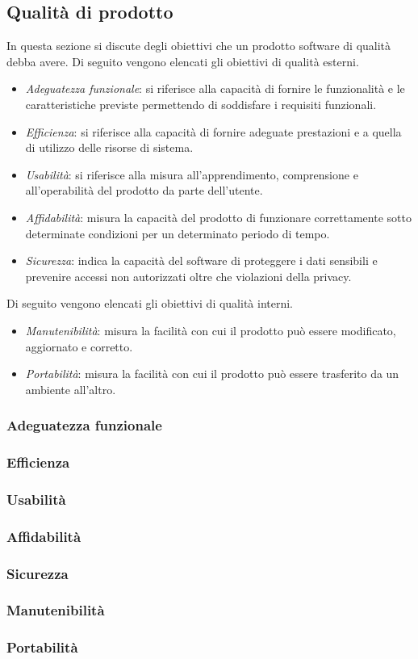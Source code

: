 \subsection{Qualità di prodotto}
In questa sezione si discute degli obiettivi che un prodotto software di qualità debba avere.
Di seguito vengono elencati gli obiettivi di qualità esterni.
\begin{itemize}
    \item \emph{Adeguatezza funzionale}:
    si riferisce alla capacità di fornire le funzionalità e le caratteristiche previste permettendo di soddisfare i requisiti funzionali.
    \item \emph{Efficienza}:
    si riferisce alla capacità di fornire adeguate prestazioni e a quella di utilizzo delle risorse di sistema.
    \item \emph{Usabilità}:
    si riferisce alla misura all'apprendimento, comprensione e all'operabilità del prodotto da parte dell'utente.
    \item \emph{Affidabilità}:
    misura la capacità del prodotto di funzionare correttamente sotto determinate condizioni per un determinato periodo di tempo.
    \item \emph{Sicurezza}:
    indica la capacità del software di proteggere i dati sensibili e prevenire accessi non autorizzati oltre che violazioni della privacy.
\end{itemize}
Di seguito vengono elencati gli obiettivi di qualità interni.
\begin{itemize}
    \item \emph{Manutenibilità}:
    misura la facilità con cui il prodotto può essere modificato, aggiornato e corretto.
    \item \emph{Portabilità}:
    misura la facilità con cui il prodotto può essere trasferito da un ambiente all'altro.
\end{itemize}

\subsubsection{Adeguatezza funzionale}
\subsubsection{Efficienza}
\subsubsection{Usabilità}
\subsubsection{Affidabilità}
\subsubsection{Sicurezza}
\subsubsection{Manutenibilità}
\subsubsection{Portabilità}
